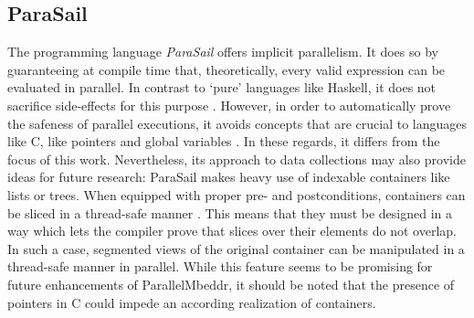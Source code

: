 \subsection{ParaSail}
The programming language \textit{ParaSail} offers implicit parallelism. It does so by guaranteeing at compile time that, theoretically, every valid expression can be evaluated in parallel. In contrast to `pure' languages like Haskell, it does not sacrifice side-effects for this purpose \cite{APointerFreePath}. However, in order to automatically prove the safeness of parallel executions, it avoids concepts that are crucial to languages like C, like pointers and global variables \cite{ParaSailLessIsMore}. In these regards, it differs from the focus of this work. Nevertheless, its approach to data collections may also provide ideas for future research: ParaSail makes heavy use of indexable containers like lists or trees. When equipped with proper pre- and postconditions, containers can be sliced in a thread-safe manner \cite{ParaSailReferenceManual}. This means that they must be designed in a way which lets the compiler prove that slices over their elements do not overlap. In such a case, segmented views of the original container can be manipulated in a thread-safe manner in parallel. While this feature seems to be promising for future enhancements of ParallelMbeddr, it should be noted that the presence of pointers in C could impede an according realization of containers.


